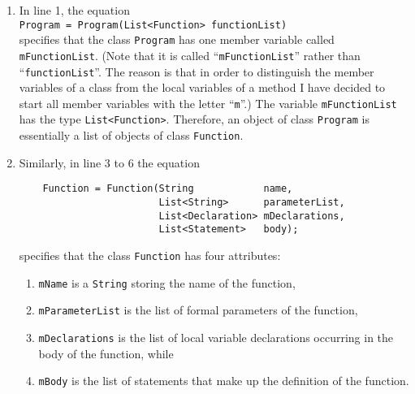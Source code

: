 \begin{enumerate}
\item In line 1, the equation
      \\[0.2cm]
      \hspace*{1.3cm}
      \texttt{Program = Program(List<Function> functionList)}
      \\[0.2cm]
      specifies that the class \texttt{Program} has one member variable called
      \texttt{mFunctionList}.  (Note that it is called ``\texttt{mFunctionList}'' rather than
      ``\texttt{functionList}''.  The reason is that in order to distinguish the member variables of
      a class from the local variables of a method I have decided to start all member variables with
      the letter ``\texttt{m}''.)
      The variable \texttt{mFunctionList} has the type \texttt{List<Function>}.
      Therefore, an object of class \texttt{Program} is essentially a list of objects of
      class \texttt{Function}.
\item Similarly, in line 3 to 6 the equation
      \begin{verbatim}
    Function = Function(String            name, 
                        List<String>      parameterList, 
                        List<Declaration> mDeclarations,
                        List<Statement>   body);
      \end{verbatim}
      \vspace*{-0.5cm}

      specifies that the class \texttt{Function} has four attributes:
      \begin{enumerate}
      \item \texttt{mName} is a \texttt{String} storing the name of the function,
      \item \texttt{mParameterList} is the list of formal parameters of the function,
      \item \texttt{mDeclarations} is the list of local variable declarations occurring in
            the body of the function, while
      \item \texttt{mBody} is the list of statements that make up the definition of the function.
      \end{enumerate}
      \pagebreak


\end{enumerate}
